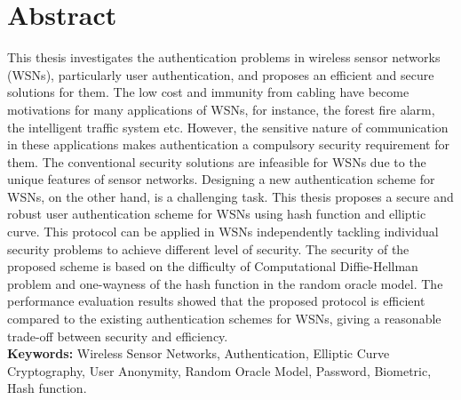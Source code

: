 \documentclass[a4paper,12pt]{report}
\begin{document}
\chapter*{Abstract}
This thesis investigates the authentication problems in wireless
sensor networks (WSNs), particularly user authentication, and
proposes an efficient and secure solutions for them. The low cost
and immunity from cabling have become motivations for many
applications of WSNs, for instance, the forest fire alarm, the
intelligent traffic system etc. However, the sensitive nature of
communication in these applications makes authentication a
compulsory security requirement for them. The conventional security
solutions are infeasible for WSNs due to the unique features of
sensor networks. Designing a new authentication scheme for WSNs, on
the other hand, is a challenging task. This thesis proposes a secure
and robust user authentication scheme for WSNs using hash function
and elliptic curve. This protocol can be applied in WSNs
independently tackling individual security problems to achieve
different level of security. The security of the proposed scheme is
based on the difficulty of Computational Diffie-Hellman problem and
one-wayness of the hash function in the random oracle model. The
performance evaluation results showed that the proposed protocol is
efficient compared to the existing authentication schemes for WSNs,
giving a reasonable trade-off between security and efficiency.\\
\linebreak \textbf{Keywords:} Wireless Sensor Networks,
Authentication, Elliptic Curve Cryptography, User Anonymity, Random
Oracle Model, Password, Biometric, Hash function.

\pagebreak \tableofcontents

\listoffigures \listoftables
\end{document}
